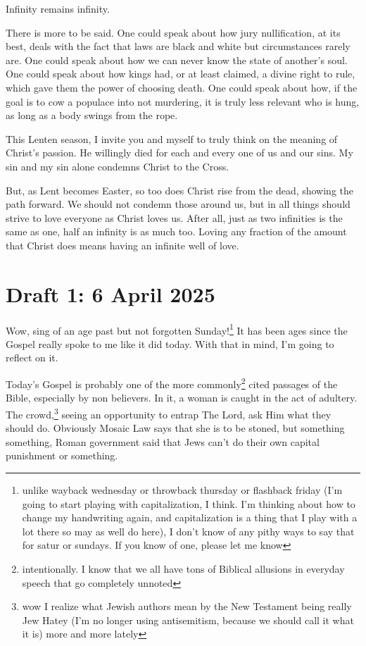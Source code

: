 \documentclass[12pt]{article}[titlepage]
\renewcommand{\,}{\textsuperscript{,}}
\begin{document}
Infinity remains infinity.

There is more to be said.  
One could speak about how jury nullification, at its best, deals with the fact that laws are black and white but circumstances rarely are.  
One could speak about how we can never know the state of another's soul.  
One could speak about how kings had, or at least claimed, a divine right to rule, which gave them the power of choosing death.  
One could speak about how, if the goal is to cow a populace into not murdering, it is truly less relevant who is hung, as long as a body swings from the rope.

This Lenten season, I invite you and myself to truly think on the meaning of Christ's passion.  
He willingly died for each and every one of us and our sins.  
My sin and my sin alone condemns Christ to the Cross.

But, as Lent becomes Easter, so too does Christ rise from the dead, showing the path forward.  
We should not condemn those around us, but in all things should strive to love everyone as Christ loves us.  
After all, just as two infinities is the same as one, half an infinity is as much too.  
Loving any fraction of the amount that Christ does means having an infinite well of love.

\section{Draft 1: 6 April 2025}

Wow, sing of an age past but not forgotten Sunday!\footnote{unlike wayback wednesday or throwback thursday or flashback friday (I'm going to start playing with capitalization, I think. I'm thinking about how to change my handwriting again, and capitalization is a thing that I play with a lot there so may as well do here), I don't know of any pithy ways to say that for satur or sundays. If you know of one, please let me know}  
It has been ages since the Gospel really spoke to me like it did today.  
With that in mind, I'm going to reflect on it.

Today's Gospel is probably one of the more commonly\footnote{intentionally. I know that we all have tons of Biblical allusions in everyday speech that go completely unnoted} cited passages of the Bible, especially by non believers.  
In it, a woman is caught in the act of adultery.  
The crowd,\footnote{wow I realize what Jewish authors mean by the New Testament being really Jew Hatey (I'm no longer using antisemitism, because we should call it what it is) more and more lately} seeing an opportunity to entrap The Lord, ask Him what they should do.  
Obviously Mosaic Law says that she is to be stoned, but something something, Roman government said that Jews can't do their own capital punishment or something.
\end{document}
